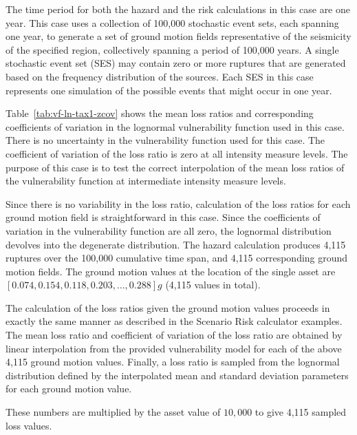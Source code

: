 The time period for both the hazard and the risk calculations in this case are one year. This case uses a collection of 100,000 stochastic event sets, each spanning one year, to generate a set of ground motion fields representative of the seismicity of the specified region, collectively spanning a period of 100,000 years. A single stochastic event set (SES) may contain zero or more ruptures that are generated based on the frequency distribution of the sources. Each SES in this case represents one simulation of the possible events that might occur in one year.

Table~\ref{tab:vf-ln-tax1-zcov} shows the mean loss ratios and corresponding coefficients of variation in the lognormal vulnerability function used in this case. There is no uncertainty in the vulnerability function used for this case. The coefficient of variation of the loss ratio is zero at all intensity measure levels. The purpose of this case is to test the correct interpolation of the mean loss ratios of the vulnerability function at intermediate intensity measure levels.

Since there is no variability in the loss ratio, calculation of the loss ratios for each ground motion field is straightforward in this case. Since the coefficients of variation in the vulnerability function are all zero, the lognormal distribution devolves into the degenerate distribution. The hazard calculation produces 4,115 ruptures over the 100,000 cumulative time span, and 4,115 corresponding ground motion fields. The ground motion values at the location of the single asset are $[0.074, 0.154, 0.118, 0.203, \dots, 0.288] g$ (4,115 values in total).

The calculation of the loss ratios given the ground motion values proceeds in exactly the same manner as described in the Scenario Risk calculator examples. The mean loss ratio and coefficient of variation of the loss ratio are obtained by linear interpolation from the provided vulnerability model for each of the above 4,115 ground motion values. Finally, a loss ratio is sampled from the lognormal distribution defined by the interpolated mean and standard deviation parameters for each ground motion value.

These numbers are multiplied by the asset value of $10,000$ to give 4,115 sampled loss values.
